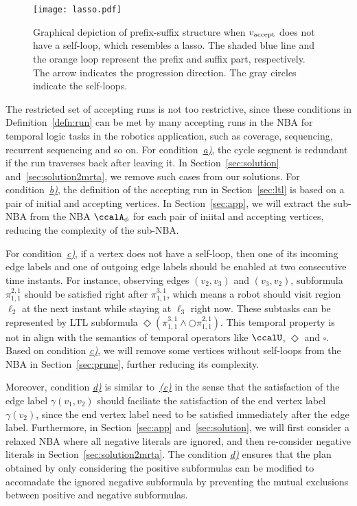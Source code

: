 \documentclass[Afour,sageh,times]{sagej}
\newcommand{\autop}{\ccalA_{\phi}}
\newcommand{\vertex}[1]{v_{\textup{#1}}}
\renewcommand{\ap}[3]{\mathcal{\pi}_{{#1},{#2}}^{#3}}
\begin{document}
\begin{figure}[t]
  \centering
  \texttt{[image: lasso.pdf]}
  \caption{Graphical depiction of prefix-suffix structure when $\vertex{accept}$ does not have a self-loop, which resembles a lasso. The shaded blue line and the orange loop represent the prefix and suffix part, respectively. The arrow indicates the progression direction. The gray circles indicate the self-loops.}
  \label{fig:lasso}
\end{figure}

The restricted set of accepting runs is not too restrictive, since these  conditions in Definition~\ref{defn:run} can be met by many accepting runs in the NBA for temporal logic tasks in the robotics application, such as coverage, sequencing, recurrent sequencing and so on.
      For condition~\hyperref[cond:a]{\it a)}, the cycle segment is redundant if the run traverses back after leaving it. In Section~\ref{sec:solution} and~\ref{sec:solution2mrta}, we remove such cases from our solutions.
      For condition~\hyperref[cond:b]{\it b)}, the definition of the accepting run in Section~\ref{sec:ltl} is based on a pair of initial and accepting vertices. In Section~\ref{sec:app}, we will extract the sub-NBA from the NBA $\autop$ for each pair of iniital and accepting vertices, reducing the complexity of the sub-NBA.

      For condition~\hyperref[cond:c]{\it c)}, if a vertex does not have a self-loop, then one of its incoming edge labels  and one of outgoing edge labels  should be enabled at two consecutive time instants. For instance, observing edges $(v_2, v_3)$ and $(v_3, v_2)$, subformula $\ap{1}{1}{2,1}$ should be satisfied right after $\ap{1}{1}{3,1}$, which means a robot  should visit region $\ell_2$ at the next instant while staying at $\ell_3$ right now. These subtasks can be represented by LTL subformula $\Diamond(\ap{1}{1}{3,1} \wedge  \bigcirc \ap{1}{1}{2,1})$. This temporal property is not in align with the semantics of temporal operators like $\ccalU$, $\Diamond$ and $\square$. Based on condition \hyperref[cond:c]{\it c)}, we will remove some vertices without self-loops from the NBA in Section~\ref{sec:prune}, further reducing its complexity.

      Moreover, condition \hyperref[cond:d]{\it d)} is similar to~\hyperref[cond:c]{\it (c)} in the sense that  the satisfaction of the edge label $\gamma(v_1, v_2)$ should faciliate the satisfaction of the end vertex label $\gamma(v_2)$, since the end vertex label need to be satisfied immediately after the edge label. Furthermore, in Section~\ref{sec:app} and~\ref{sec:solution}, we will first consider a relaxed NBA where all negative literals are ignored, and then re-consider negative literals in Section~\ref{sec:solution2mrta}. The condition \hyperref[cond:d]{\it d)} ensures that the plan obtained by only considering the positive subformulas can be modified to accomadate the ignored negative subformula by preventing the mutual exclusions between positive and negative subformulas.
\end{document}
